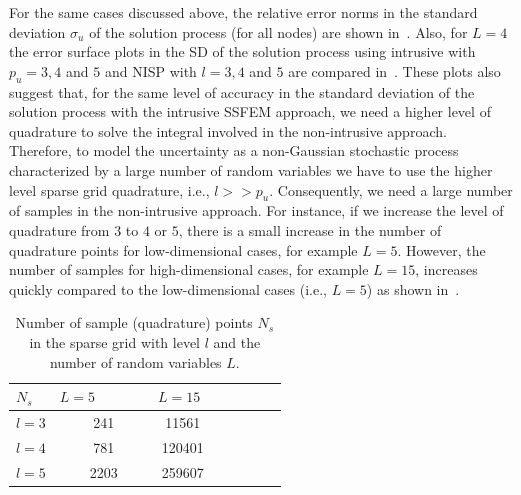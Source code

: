 \documentclass[letter,1p,11pt,oneside,onecolumn,sort&compress]{elsarticle}
\begin{document}
For the same cases discussed above, the relative error norms in the standard deviation $\sigma_u$ of the solution process (for all nodes) %
are shown in~.
Also, for $L=4$ the error surface plots in the SD of the solution process using intrusive with $p_u=3,4$ and $5$ and NISP with $l=3,4$ and $5$ are compared in~.
These plots also suggest that, for the same level of accuracy in the standard deviation of the solution process with the intrusive SSFEM approach, we need a higher level of quadrature to solve the integral involved in the non-intrusive approach.
Therefore, to model the uncertainty as a non-Gaussian stochastic process characterized by a large number of random variables we have to use the higher level sparse grid quadrature, i.e., $l>>p_u$.
Consequently, we need a large number of samples in the non-intrusive approach. For instance, if we increase the level of quadrature from $3$ to $4$ or $5$, there is a small increase in the number of quadrature points for low-dimensional cases, for example $L=5$. However, the number of samples for high-dimensional cases, for example $L=15$, increases quickly compared to the low-dimensional cases (i.e., $L=5$) as shown in~.
\begin{table}[htbp]
\centering
\begin{tabular}{l*{6}{c}r}
\hline
$N_s$              & $L=5$  \ \ \ \ \ & $L=15$ \\
\hline
$l=3$	& \ 241 & \ 11561  \\ \hline
$l=4$ & \ 781 & \ 120401  \\ \hline
$l=5$ & \ 2203 & \ 259607  \\
\hline
\end{tabular}
\caption{Number of sample (quadrature) points $N_s$ in the sparse grid with level $l$ and the number of random variables $L$.}
\label{table:table3}
\end{table}
\end{document}
